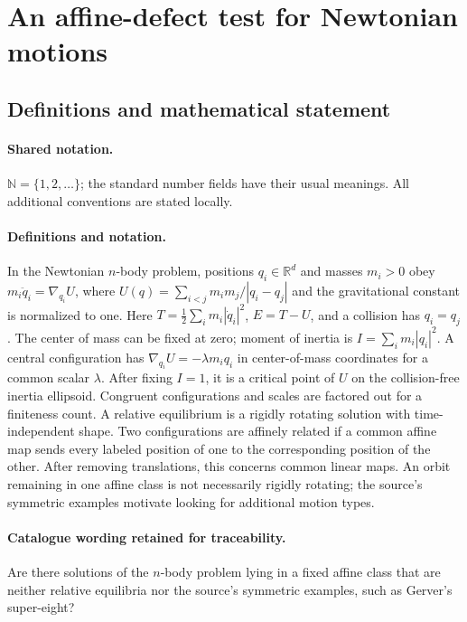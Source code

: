 \documentclass[11pt]{article}
\begin{document}
\section{An affine-defect test for Newtonian motions}\label{statement}

\subsection{Definitions and mathematical statement}

\paragraph{Shared notation.}$\mathbb N=\{1,2,\ldots\}$; the standard number fields have their usual meanings. All additional conventions are stated locally.


\paragraph{Definitions and notation.}In the Newtonian $n$-body problem, positions $q_i\in\mathbb R^d$ and masses $m_i>0$ obey $m_i\ddot q_i=\nabla_{q_i}U$, where $U(q)=\sum_{i<j}m_im_j/|q_i-q_j|$ and the gravitational constant is normalized to one. Here $T=\tfrac12\sum_i m_i|\dot q_i|^2$, $E=T-U$, and a collision has $q_i=q_j$. The center of mass can be fixed at zero; moment of inertia is $I=\sum_i m_i|q_i|^2$. A central configuration has $\nabla_{q_i}U=-\lambda m_iq_i$ in center-of-mass coordinates for a common scalar $\lambda$. After fixing $I=1$, it is a critical point of $U$ on the collision-free inertia ellipsoid. Congruent configurations and scales are factored out for a finiteness count. A relative equilibrium is a rigidly rotating solution with time-independent shape. Two configurations are affinely related if a common affine map sends every labeled position of one to the corresponding position of the other. After removing translations, this concerns common linear maps. An orbit remaining in one affine class is not necessarily rigidly rotating; the source’s symmetric examples motivate looking for additional motion types.

\paragraph{Catalogue wording retained for traceability.}
Are there solutions of the $n$-body problem lying in a fixed affine class that are neither relative equilibria nor the source’s symmetric examples, such as Gerver’s super-eight?
\end{document}

